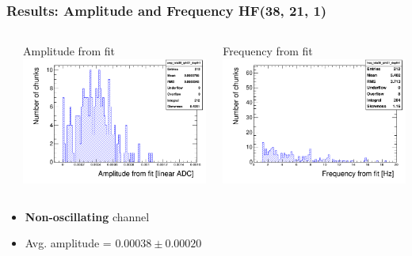 \documentclass[bigger]{beamer}
\providecommand{\alert}[1]{\textbf{#1}}
\begin{document}
\begin{frame}
\frametitle{Results: Amplitude and Frequency HF(38, 21, 1)}
\label{sec-3-3-4}
\begin{columns} %
\label{sec-3-3-4-1}
\begin{column}{0.55\textwidth}
\label{sec-3-3-4-1-1}

\centering
Amplitude from fit
\includegraphics[width=.9\linewidth]{fig/amp_ieta38_iphi21_depth1.png}
\end{column}
\begin{column}{0.55\textwidth}
\label{sec-3-3-4-1-2}

\centering
Frequency from fit
\includegraphics[width=.9\linewidth]{fig/freq_ieta38_iphi21_depth1.png}
\end{column}
\end{columns}
\begin{itemize}

\item \alert{Non-oscillating} channel
\label{sec-3-3-4-2}%

\item Avg. amplitude = $0.00038 \pm 0.00020$
\label{sec-3-3-4-3}%
\end{itemize} %
\end{frame}
\end{document}
